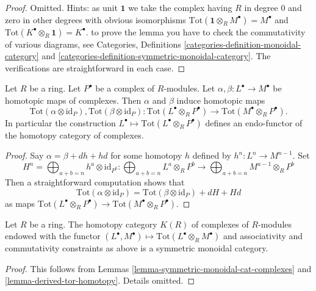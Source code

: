 \begin{proof}
Omitted. Hints: as unit $\mathbf{1}$ we take the complex having
$R$ in degree $0$ and zero in other degrees with obvious isomorphisms
$\text{Tot}(\mathbf{1} \otimes_R M^\bullet) = M^\bullet$ and
$\text{Tot}(K^\bullet \otimes_R \mathbf{1}) = K^\bullet$.
to prove the lemma you have to check the commutativity
of various diagrams, see Categories, Definitions
\ref{categories-definition-monoidal-category} and
\ref{categories-definition-symmetric-monoidal-category}.
The verifications are straightforward in each case.
\end{proof}

\begin{lemma}
\label{lemma-derived-tor-homotopy}
Let $R$ be a ring. Let $P^\bullet$ be a complex of $R$-modules.
Let $\alpha, \beta : L^\bullet \to M^\bullet$ be homotopic
maps of complexes. Then $\alpha$ and $\beta$ induce homotopic maps
$$
\text{Tot}(\alpha \otimes \text{id}_P),
\text{Tot}(\beta \otimes \text{id}_P) :
\text{Tot}(L^\bullet \otimes_R P^\bullet)
\longrightarrow
\text{Tot}(M^\bullet \otimes_R P^\bullet).
$$
In particular the construction
$L^\bullet \mapsto \text{Tot}(L^\bullet \otimes_R P^\bullet)$
defines an endo-functor of the homotopy category of complexes.
\end{lemma}

\begin{proof}
Say $\alpha = \beta + dh + hd$ for some homotopy $h$ defined by
$h^n : L^n \to M^{n - 1}$. Set
$$
H^n = \bigoplus\nolimits_{a + b = n} h^a \otimes \text{id}_{P^b} :
\bigoplus\nolimits_{a + b = n} L^a \otimes_R P^b
\longrightarrow
\bigoplus\nolimits_{a + b = n} M^{a - 1} \otimes_R P^b
$$
Then a straightforward computation shows that
$$
\text{Tot}(\alpha \otimes \text{id}_P) =
\text{Tot}(\beta \otimes \text{id}_P) + dH + Hd
$$
as maps $\text{Tot}(L^\bullet \otimes_R P^\bullet) \to
\text{Tot}(M^\bullet \otimes_R P^\bullet)$.
\end{proof}

\begin{lemma}
\label{lemma-symmetric-monoidal-homotopy-category}
Let $R$ be a ring. The homotopy category $K(R)$ of complexes of $R$-modules
endowed with the functor
$(L^\bullet, M^\bullet) \mapsto \text{Tot}(L^\bullet \otimes_R M^\bullet)$
and associativity and commutativity constraints as above is a symmetric
monoidal category.
\end{lemma}

\begin{proof}
This follows from Lemmas \ref{lemma-symmetric-monoidal-cat-complexes} and
\ref{lemma-derived-tor-homotopy}. Details omitted.
\end{proof}

